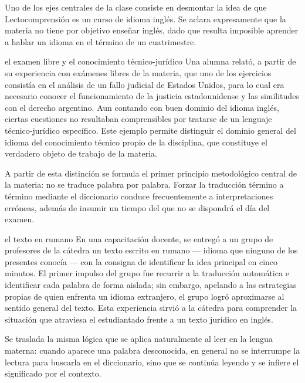 \documentclass[12pt,oneside]{book}
\begin{document}
Uno de los ejes centrales de la clase consiste en desmontar la idea de que Lectocomprensión es un curso de idioma inglés. Se aclara expresamente que la materia no tiene por objetivo enseñar inglés, dado que resulta imposible aprender a hablar un idioma en el término de un cuatrimestre.

\begin{example}{el examen libre y el conocimiento técnico-jurídico}
Una alumna relató, a partir de su experiencia con exámenes libres de la materia, que uno de los ejercicios consistía en el análisis de un fallo judicial de Estados Unidos, para lo cual era necesario conocer el funcionamiento de la justicia estadounidense y las similitudes con el derecho argentino. Aun contando con buen dominio del idioma inglés, ciertas cuestiones no resultaban comprensibles por tratarse de un lenguaje técnico-jurídico específico. Este ejemplo permite distinguir el dominio general del idioma del conocimiento técnico propio de la disciplina, que constituye el verdadero objeto de trabajo de la materia.
\end{example}

A partir de esta distinción se formula el primer principio metodológico central de la materia: no se traduce palabra por palabra. Forzar la traducción término a término mediante el diccionario conduce frecuentemente a interpretaciones erróneas, además de insumir un tiempo del que no se dispondrá el día del examen.

\begin{example}{el texto en rumano}
En una capacitación docente, se entregó a un grupo de profesores de la cátedra un texto escrito en rumano --- idioma que ninguno de los presentes conocía --- con la consigna de identificar la idea principal en cinco minutos. El primer impulso del grupo fue recurrir a la traducción automática e identificar cada palabra de forma aislada; sin embargo, apelando a las estrategias propias de quien enfrenta un idioma extranjero, el grupo logró aproximarse al sentido general del texto. Esta experiencia sirvió a la cátedra para comprender la situación que atraviesa el estudiantado frente a un texto jurídico en inglés.
\end{example}

Se traslada la misma lógica que se aplica naturalmente al leer en la lengua materna: cuando aparece una palabra desconocida, en general no se interrumpe la lectura para buscarla en el diccionario, sino que se continúa leyendo y se infiere el significado por el contexto.
\end{document}
